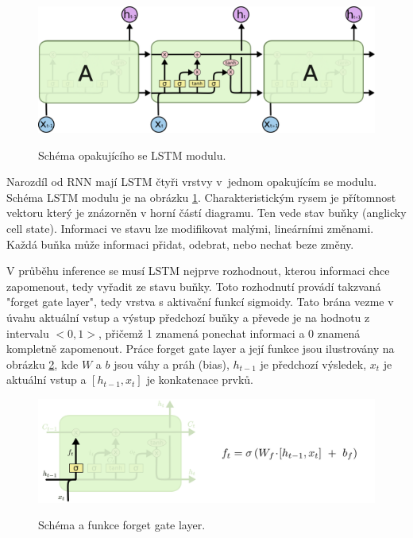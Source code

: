 \begin{figure}[h]\centering
    \centering
    \includegraphics[width=0.8\linewidth]{obrazky/LSTM3-chain.png}\\[1pt]  
    \caption{Schéma opakujícího se LSTM modulu. \cite{colah_lstm}}    
    \label{obrazekLSTMBunka}
\end{figure}

Narozdíl od RNN mají LSTM čtyři vrstvy v~jednom opakujícím se modulu.
Schéma LSTM modulu je na obrázku \ref{obrazekLSTMBunka}.
Charakteristickým rysem je přítomnost vektoru
který je znázorněn v horní částí diagramu.
Ten vede stav buňky (anglicky cell state).
Informaci ve stavu lze modifikovat malými, lineárními změnami.
Každá buňka může informaci přidat, odebrat, nebo nechat beze změny.
\par

V průběhu inference se musí LSTM nejprve rozhodnout,
kterou informaci chce zapomenout, 
tedy vyřadit ze stavu buňky.
Toto rozhodnutí provádí takzvaná "forget gate layer",
tedy vrstva s aktivační funkcí sigmoidy.
Tato brána vezme v úvahu aktuální vstup a výstup předchozí buňky
a převede je na hodnotu z intervalu $<0,1>$,
přičemž 1 znamená ponechat informaci
a 0 znamená kompletně zapomenout.
Práce forget gate layer a její funkce jsou ilustrovány na obrázku 
\ref{obrazekForgetGate}, kde $W$ a $b$ jsou váhy a práh (bias),
$h_{t-1}$ je předchozí výsledek, $x_t$ je aktuální vstup a 
$[h_{t-1}, x_t]$ je konkatenace prvků.

\begin{figure}[h]\centering
    \centering
    \includegraphics[width=0.8\linewidth]{obrazky/LSTM3-focus-f.png}\\[1pt]  
    \caption{Schéma a funkce forget gate layer. \cite{colah_lstm}}    
    \label{obrazekForgetGate}
\end{figure}

